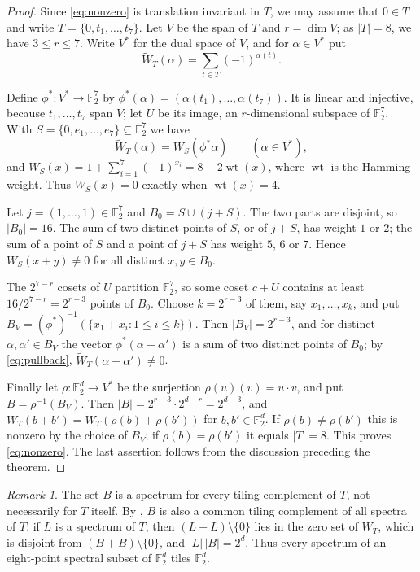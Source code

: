 \documentclass[11pt]{amsart}
\theoremstyle{definition}
\theoremstyle{remark}
\newtheorem{remark}[theorem]{Remark}
\numberwithin{equation}{section}
\numberwithin{table}{section}
\newcommand{\F}{\mathbb{F}}
\newcommand{\wt}{\operatorname{wt}}
\begin{document}
\begin{proof}
Since \eqref{eq:nonzero} is translation invariant in $T$, we may assume that $0\in T$ and write $T=\{0,t_1,\dots,t_7\}$. Let $V$ be the span of $T$ and $r=\dim V$; as $|T|=8$, we have $3\le r\le 7$. Write $V^*$ for the dual space of $V$, and for $\alpha\in V^*$ put
\[
\widetilde W_T(\alpha)=\sum_{t\in T}(-1)^{\alpha(t)}.
\]

Define $\phi^*\colon V^*\to\F_2^7$ by $\phi^*(\alpha)=(\alpha(t_1),\dots,\alpha(t_7))$. It is linear and injective, because $t_1,\dots,t_7$ span $V$; let $U$ be its image, an $r$-dimensional subspace of $\F_2^7$. With $S=\{0,e_1,\dots,e_7\}\subseteq\F_2^7$ we have
\begin{equation}\label{eq:pullback}
\widetilde W_T(\alpha)=W_S(\phi^*\alpha)\qquad(\alpha\in V^*),
\end{equation}
and $W_S(x)=1+\sum_{i=1}^7(-1)^{x_i}=8-2\wt(x)$, where $\wt$ is the Hamming weight. Thus $W_S(x)=0$ exactly when $\wt(x)=4$.

Let $j=(1,\dots,1)\in\F_2^7$ and $B_0=S\cup(j+S)$. The two parts are disjoint, so $|B_0|=16$. The sum of two distinct points of $S$, or of $j+S$, has weight $1$ or $2$; the sum of a point of $S$ and a point of $j+S$ has weight $5$, $6$ or $7$. Hence $W_S(x+y)\ne0$ for all distinct $x,y\in B_0$.

The $2^{7-r}$ cosets of $U$ partition $\F_2^7$, so some coset $c+U$ contains at least $16/2^{7-r}=2^{r-3}$ points of $B_0$. Choose $k=2^{r-3}$ of them, say $x_1,\dots,x_k$, and put $B_V=(\phi^*)^{-1}(\{x_1+x_i:1\le i\le k\})$. Then $|B_V|=2^{r-3}$, and for distinct $\alpha,\alpha'\in B_V$ the vector $\phi^*(\alpha+\alpha')$ is a sum of two distinct points of $B_0$; by \eqref{eq:pullback}, $\widetilde W_T(\alpha+\alpha')\ne0$.

Finally let $\rho\colon\F_2^d\to V^*$ be the surjection $\rho(u)(v)=u\cdot v$, and put $B=\rho^{-1}(B_V)$. Then $|B|=2^{r-3}\cdot2^{d-r}=2^{d-3}$, and $W_T(b+b')=\widetilde W_T(\rho(b)+\rho(b'))$ for $b,b'\in\F_2^d$. If $\rho(b)\ne\rho(b')$ this is nonzero by the choice of $B_V$; if $\rho(b)=\rho(b')$ it equals $|T|=8$. This proves \eqref{eq:nonzero}. The last assertion follows from the discussion preceding the theorem.
\end{proof}

\begin{remark}\label{rem:universal}
The set $B$ is a spectrum for every tiling complement of $T$, not necessarily for $T$ itself. By \cite[Proposition~4]{FMM06}, $B$ is also a common tiling complement of all spectra of $T$: if $L$ is a spectrum of $T$, then $(L+L)\setminus\{0\}$ lies in the zero set of $W_T$, which is disjoint from $(B+B)\setminus\{0\}$, and $|L|\,|B|=2^d$. Thus every spectrum of an eight-point spectral subset of $\F_2^d$ tiles $\F_2^d$.
\end{remark}
\end{document}
